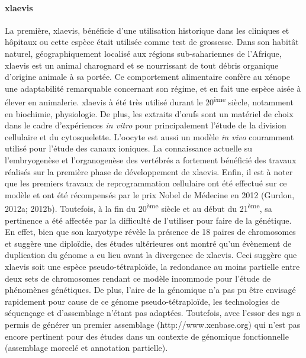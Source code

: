 \documentclass[../main.tex]{subfiles}
\begin{document}
\paragraph{\gls{xlaevis}}
La première, \gls{xlaevis}, bénéficie d'une utilisation historique dans les cliniques et hôpitaux ou cette espèce était utilisée comme test de grossesse.
Dans son habitât naturel, géographiquement localisé aux régions sub-sahariennes de l'Afrique, \gls{xlaevis} est un animal charognard et se nourrissant de tout débris organique d'origine animale à sa portée.
Ce comportement alimentaire confère au xénope une adaptabilité remarquable concernant son régime, et en fait une espèce aisée à élever en animalerie.
\gls{xlaevis} à été très utilisé durant le 20\textsuperscript{ème} siècle, notamment en biochimie, physiologie.
De plus, les extraits d'œufs sont un matériel de choix dans le cadre d'expériences \textit{in vitro} pour principalement l'étude de la division cellulaire et du cytosquelette.
L'oocyte est aussi un modèle \textit{in vivo} couramment utilisé pour l'étude des canaux ioniques.
La connaissance actuelle su l'embryogenèse et l'organogenèse des vertébrés a fortement bénéficié des travaux réalisés sur la première phase de développement de \gls{xlaevis}.
Enfin, il est à noter que les premiers travaux de reprogrammation cellulaire ont été effectué sur ce modèle et ont été récompensés par le prix Nobel de Médecine en 2012 (Gurdon, 2012a; 2012b).
Toutefois, à la fin du 20\textsuperscript{ème} siècle et au début du 21\textsuperscript{ème}, sa pertinence a été affectée par la difficulté de l'utiliser pour faire de la génétique.
En effet, bien que son karyotype révèle la présence de 18 paires de chromosomes et suggère une diploïdie, des études ultérieures ont montré qu'un évènement de duplication du génome a eu lieu avant la divergence de \gls{xlaevis}. 
Ceci suggère que \gls{xlaevis} soit une espèce pseudo-tétraploïde, la redondance au moins partielle entre deux sets de chromosomes rendant ce modèle incommode pour l'étude de phénomènes génétiques.
De plus, l'aire de la génomique n'a pas pu être envisagé rapidement pour cause de ce génome pseudo-tétraploïde, les technologies de séquençage et d'assemblage n'étant pas adaptées.
Toutefois, avec l'essor des \gls{ngs} a permis de générer un premier assemblage (http://www.xenbase.org) qui n'est pas encore pertinent pour des études dans un contexte de génomique fonctionnelle (assemblage morcelé et annotation partielle).
\end{document}
